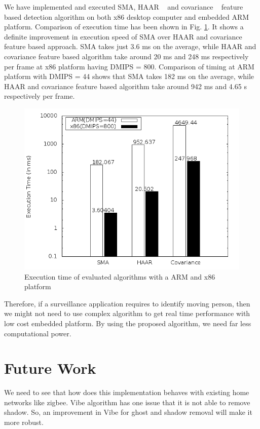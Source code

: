 \documentclass[conference]{IEEEtran}
\begin{document}
\indent We have implemented and executed SMA, HAAR ~\cite{2} and
covariance ~\cite{19} feature based detection algorithm on both x86
desktop computer and embedded ARM platform. Comparison of execution time
has been shown in Fig.  \ref{pipeline_execution_time}. It shows a
definite improvement in execution speed of SMA over HAAR and covariance
feature based approach.  SMA takes just 3.6 ms on the average, while
HAAR and covariance feature based algorithm take around 20 ms and 248 ms
respectively per frame at x86 platform having DMIPS = 800. Comparison of
timing at ARM platform with DMIPS = 44 shows that SMA takes 182 ms
on the average, while HAAR and covariance feature based algorithm take
around 942 ms and 4.65 s respectively per frame.  \\
\begin{figure}[!h]
\centering
\includegraphics[scale=0.30]{figures/pipeline_execution_time}
\caption{Execution time of evaluated algorithms with a ARM and x86
platform}
\label{pipeline_execution_time}
\end{figure}

Therefore, if a surveillance application requires to identify moving person,
then we might not need to use complex algorithm to get real time
performance with low cost embedded platform. By using the proposed
algorithm, we need far less computational power.

\section{Future Work}

We need to see that how does this implementation behaves with existing home
networks like zigbee. Vibe algorithm has one issue that it is not able to
remove shadow. So, an improvement in Vibe for ghost and shadow removal
will make it more robust.
\end{document}
